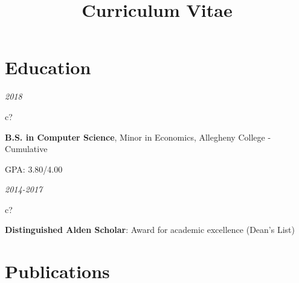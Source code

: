 \documentclass[12pt,a4paper,sans]{moderncv} %
\title{Curriculum Vitae}
\begin{document}
\begin{comment}
\hspace{2 mm}
\textit{2018}
\hspace{2 mm}
\begin{tabular}{c?}
 \\
\end{tabular}
 \hspace{2 mm}
 \textbf{B.S. in Computer Science}, Minor in Economics, Allegheny College - Cumulative GPA: 3.80
\end{comment}

\makecvtitle %
\vspace{-13 mm}
\section{Education}
\hspace{11 mm}
\textit{2018}
\hspace{2 mm}
\begin{tabular}{c?}
 \\
\end{tabular}
 \hspace{2 mm}
 \textbf{B.S. in Computer Science}, Minor in Economics, Allegheny College - Cumulative 
 
 \hspace{31.5 mm}GPA: 3.80/4.00
 
 \vspace{1 mm}
 \hspace{2 mm}
\textit{2014-2017}
\hspace{2 mm}
\begin{tabular}{c?}
 \\
\end{tabular}
 \hspace{2 mm}
 \textbf{Distinguished Alden Scholar}: Award for academic excellence (Dean's List)
 
\vspace{-4 mm}
\section{Publications}
\end{document}
